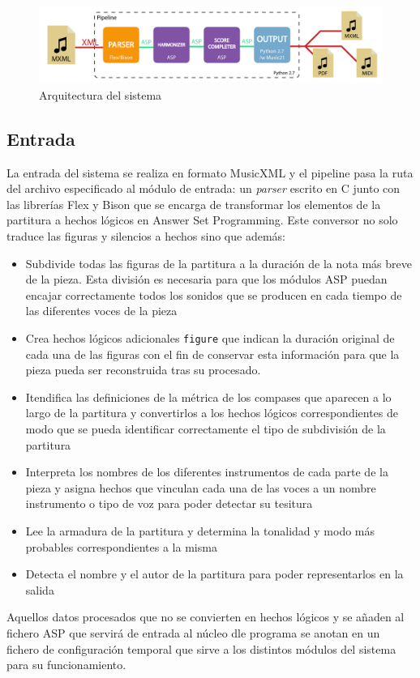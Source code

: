 \begin{figure}[h]
	\centering
	\includegraphics[width=0.8\linewidth]{imagenes/arquitectura_final.pdf}
	\caption{Arquitectura del sistema}
	\label{fig:arquitectura_final}
\end{figure}

\subsection{Entrada}
La entrada del sistema se realiza en formato MusicXML y el pipeline pasa la ruta del archivo especificado al módulo de entrada: un \textit{parser} escrito en C junto con las librerías Flex y Bison que se encarga de transformar los elementos de la partitura a hechos lógicos en Answer Set Programming. Este conversor no solo traduce las figuras y silencios a hechos sino que además:
\begin{itemize}
 	\item Subdivide todas las figuras de la partitura a la duración de la nota más breve de la pieza. Esta división es necesaria para que los módulos ASP puedan encajar correctamente todos los sonidos que se producen en cada tiempo de las diferentes voces de la pieza
 	\item Crea hechos lógicos adicionales \texttt{figure} que indican la duración original de cada una de las figuras con el fin de conservar esta información para que la pieza pueda ser reconstruida tras su procesado.
 	\item Itendifica las definiciones de la métrica de los compases que aparecen a lo largo de la partitura y convertirlos a los hechos lógicos correspondientes de modo que se pueda identificar correctamente el tipo de subdivisión de la partitura
 	\item Interpreta los nombres de los diferentes instrumentos de cada parte de la pieza y asigna hechos que vinculan cada una de las voces a un nombre instrumento o tipo de voz para poder detectar su tesitura
 	\item Lee la armadura de la partitura y determina la tonalidad y modo más probables correspondientes a la misma
 	\item Detecta el nombre y el autor de la partitura para poder representarlos en la salida
\end{itemize}
Aquellos datos procesados que no se convierten en hechos lógicos y se añaden al fichero ASP que servirá de entrada al núcleo dle programa se anotan en un fichero de configuración temporal que sirve a los distintos módulos del sistema para su funcionamiento.

